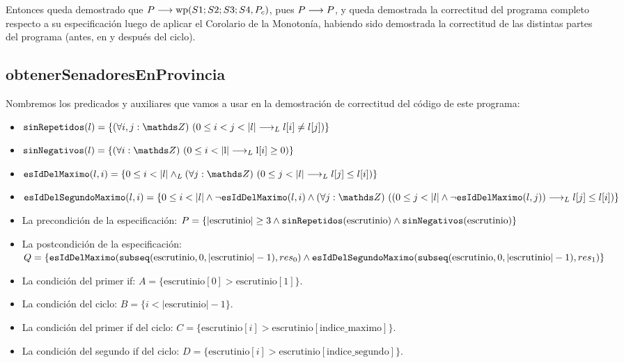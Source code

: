 \documentclass[10pt,a4paper]{article}
\newcommand{\predRef}{\texttt}
\newcommand{\var}{\text}
\renewcommand{\wp}{\text{wp}}
\begin{document}
Entonces queda demostrado que $P \implica \wp(S1;S2;S3;S4,P_c)$, pues $P \longrightarrow P$, y queda demostrada la correctitud del programa completo respecto a su especificación luego de aplicar el Corolario de la Monotonía, habiendo sido demostrada la correctitud de las distintas partes del programa (antes, en y después del ciclo).


\subsection{obtenerSenadoresEnProvincia}
Nombremos los predicados y auxiliares que vamos a usar en la demostración de correctitud del código de este programa:
\begin{itemize}
    \item $\predRef{sinRepetidos}(l) = \{\paraTodo[unalinea]{i, j}{\ent}{0\leq i < j < \longitud{l}\implicaLuego l[i]\neq l[j]}\}$
    \item $\predRef{sinNegativos}(l) = \{\paraTodo[unalinea]{i}{\ent}{0\leq i < \longitud{\var{l}}\implicaLuego \var{l}[i]\geq 0}\}$
    \item $\predRef{esIdDelMaximo}(l, i) = \{0 \leq i < \longitud{l} \yLuego
        \paraTodo[unalinea]{j}{\ent}{0\leq j < \longitud{l} \implicaLuego l[j]\leq l[i]}\}$
    \item $\predRef{esIdDelSegundoMaximo}(l, i) = \{0 \leq i < \longitud{l} \land
        \neg \predRef{esIdDelMaximo}(l, i) \land\\
        \paraTodo[unalinea]{j}{\ent}{(0\leq j < \longitud{l} \land \neg \predRef{esIdDelMaximo}(l, j))\implicaLuego l[j]\leq l[i]}\}$
    \item La precondición de la especificación: $P = \{\longitud{\var{escrutinio}} \geq 3 \land \predRef{sinRepetidos}(\var{escrutinio}) \land \predRef{sinNegativos}(\var{escrutinio})\}$
    \item La postcondición de la especificación: $Q = \{\predRef{esIdDelMaximo}(\predRef{subseq}(\var{escrutinio}, 0, \longitud{\var{escrutinio}} - 1), res_0)\land  \\ \predRef{esIdDelSegundoMaximo}(\predRef{subseq}(\var{escrutinio}, 0, \longitud{\var{escrutinio}} - 1), res_1)\}$
    \item La condición del primer if: $A = \{\var{escrutinio}[0] > \var{escrutinio}[1]\}$.
    \item La condición del ciclo: $B = \{i < |\var{escrutinio}| - 1\}$.
    \item La condición del primer if del ciclo: $C = \{\var{escrutinio}[i] > \var{escrutinio}[\var{indice\_maximo}]\}$.
    \item La condición del segundo if del ciclo: $D = \{\var{escrutinio}[i] > \var{escrutinio}[\var{indice\_segundo}]\}$.
\end{itemize}
\end{document}
